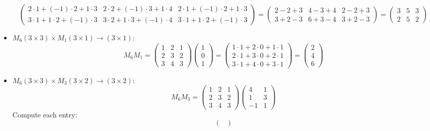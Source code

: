 \documentclass{article}
\begin{document}
\begin{itemize}
\[\begin{pmatrix}
        2 \cdot 1 + (-1) \cdot 2 + 1 \cdot 3 & 2 \cdot 2 + (-1) \cdot 3 + 1 \cdot 4 & 2 \cdot 1 + (-1) \cdot 2 + 1 \cdot 3 \\
        3 \cdot 1 + 1 \cdot 2 + (-1) \cdot 3 & 3 \cdot 2 + 1 \cdot 3 + (-1) \cdot 4 & 3 \cdot 1 + 1 \cdot 2 + (-1) \cdot 3
    \end{pmatrix}
    = \begin{pmatrix}
        2 - 2 + 3 & 4 - 3 + 4 & 2 - 2 + 3 \\
        3 + 2 - 3 & 6 + 3 - 4 & 3 + 2 - 3
    \end{pmatrix}
    = \begin{pmatrix}
        3 & 5 & 3 \\
        2 & 5 & 2
    \end{pmatrix}
    \]
    \item \( M_6 (3 \times 3) \times M_1 (3 \times 1) \to (3 \times 1) \):
    \[
    M_6 M_1 = \begin{pmatrix} 1 & 2 & 1 \\ 2 & 3 & 2 \\ 3 & 4 & 3 \end{pmatrix} \begin{pmatrix} 1 \\ 0 \\ 1 \end{pmatrix}
    = \begin{pmatrix}
        1 \cdot 1 + 2 \cdot 0 + 1 \cdot 1 \\
        2 \cdot 1 + 3 \cdot 0 + 2 \cdot 1 \\
        3 \cdot 1 + 4 \cdot 0 + 3 \cdot 1
    \end{pmatrix}
    = \begin{pmatrix}
        2 \\
        4 \\
        6
    \end{pmatrix}
    \]
    \item \( M_6 (3 \times 3) \times M_3 (3 \times 2) \to (3 \times 2) \):
    \[
    M_6 M_3 = \begin{pmatrix} 1 & 2 & 1 \\ 2 & 3 & 2 \\ 3 & 4 & 3 \end{pmatrix} \begin{pmatrix} 4 & 1 \\ 1 & 3 \\ -1 & 1 \end{pmatrix}
    \]
    Compute each entry:
    \[
    \begin{pmatrix}

\end{pmatrix}\]
\end{itemize}
\end{document}
